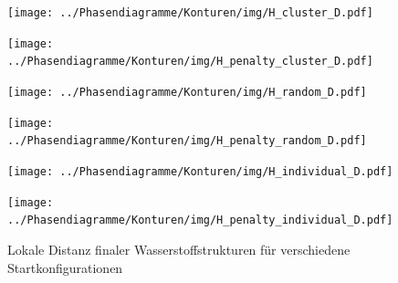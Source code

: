 \documentclass[a4paper, 10pt, twoside, openany]{book} %
\begin{document}
	\begin{figure}
		\begin{minipage}[t]{0.48\textwidth}
			\texttt{[image: ../Phasendiagramme/Konturen/img/H\_cluster\_D.pdf]}
			\label{H_cluster_D}
		\end{minipage}
		\hfill
		\begin{minipage}[t]{0.48\textwidth}
			\texttt{[image: ../Phasendiagramme/Konturen/img/H\_penalty\_cluster\_D.pdf]}
			\label{H_penalty_cluster_D}
		\end{minipage}
		\begin{minipage}[t]{0.48\textwidth}
			\texttt{[image: ../Phasendiagramme/Konturen/img/H\_random\_D.pdf]}
			\label{H_random_D}
		\end{minipage}
		\hfill
		\begin{minipage}[t]{0.48\textwidth}
			\texttt{[image: ../Phasendiagramme/Konturen/img/H\_penalty\_random\_D.pdf]}
			\label{H_penalty_random_D}
		\end{minipage}
		\begin{minipage}[t]{0.48\textwidth}
			\texttt{[image: ../Phasendiagramme/Konturen/img/H\_individual\_D.pdf]}
			\label{H_individual_D}
		\end{minipage}
		\hfill
		\begin{minipage}[t]{0.48\textwidth}
			\texttt{[image: ../Phasendiagramme/Konturen/img/H\_penalty\_individual\_D.pdf]}
			\label{H_penalty_individual_D}
		\end{minipage}
		\caption[Lokale Distanz finaler Wasserstoffstrukturen]{Lokale Distanz finaler Wasserstoffstrukturen für verschiedene Startkonfigurationen}
		\label{H_D}
	\end{figure}
	
\end{document}
